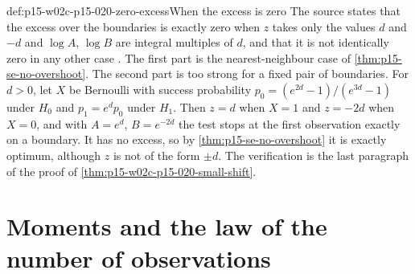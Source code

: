 \begin{hbwarning}{def:p15-w02c-p15-020-zero-excess}{When the excess is zero}
The source states that the excess over the boundaries is exactly zero
when \(z\) takes only the values \(d\) and \(-d\) and \(\log A\),
\(\log B\) are integral multiples of \(d\), and that it is not
identically zero in any other case
\cite[Section 4.7, p.~154]{Wald1945SequentialTests}. The first part is
the nearest-neighbour case of \cref{thm:p15-se-no-overshoot}. The second
part is too strong for a fixed pair of boundaries. For \(d>0\), let
\(X\) be Bernoulli with success probability
\(p_0=(e^{2d}-1)/(e^{3d}-1)\) under \(H_0\) and \(p_1=e^dp_0\) under
\(H_1\). Then \(z=d\) when \(X=1\) and \(z=-2d\) when \(X=0\), and with
\(A=e^d\), \(B=e^{-2d}\) the test stops at the first observation exactly
on a boundary. It has no excess, so by \cref{thm:p15-se-no-overshoot} it
is exactly optimum, although \(z\) is not of the form \(\pm d\). The
verification is the last paragraph of the proof of
\cref{thm:p15-w02c-p15-020-small-shift}.
\end{hbwarning}

\section{Moments and the law of the number of observations}
\label{sec:p15-w02c-p15-020-moments}

